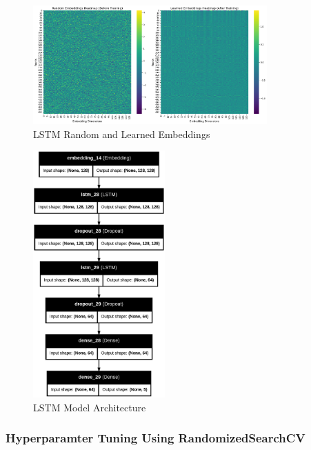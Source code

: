 \begin{figure}[h!]  
    \centering
    \includegraphics[width=0.8\textwidth]{Images/LSTM EMBED.png}  
    \caption{LSTM Random and Learned Embeddings}
    \label{lstm embed}  %
\end{figure}

\begin{figure}[h!]  
    \centering
    \includegraphics[width=0.45\textwidth]{Images/LSTM MODEL.png}  
    \caption{LSTM Model Architecture}
    \label{lstm arch}  %
\end{figure}


\subsubsection{Hyperparamter Tuning Using RandomizedSearchCV}

